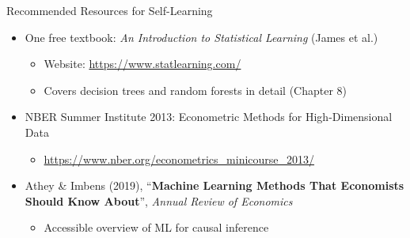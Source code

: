 \documentclass[dvipsnames,hyperref={pdfpagelabels=false}]{beamer}
\begin{document}
\begin{frame}{Recommended Resources for Self-Learning}
	\begin{itemize}
		\item One free textbook: \textit{An Introduction to Statistical Learning} (James et al.)
		\vspace{0.2cm}
		\begin{itemize}
			\item Website: \url{https://www.statlearning.com/}
			\vspace{0.2cm}
			\item Covers decision trees and random forests in detail (Chapter 8)
		\end{itemize}
		\vspace{0.3cm}
		\item NBER Summer Institute 2013: Econometric Methods for High-Dimensional Data
		\vspace{0.2cm}
		\begin{itemize}
			\item \url{https://www.nber.org/econometrics_minicourse_2013/}
		\end{itemize}
		\vspace{0.3cm}
		\item Athey \& Imbens (2019), ``\textbf{Machine Learning Methods That Economists Should Know About}'', \textit{Annual Review of Economics}
		\vspace{0.2cm}
		\begin{itemize}
			\item Accessible overview of ML for causal inference
		\end{itemize}
	\end{itemize}
\end{frame}
\end{document}
